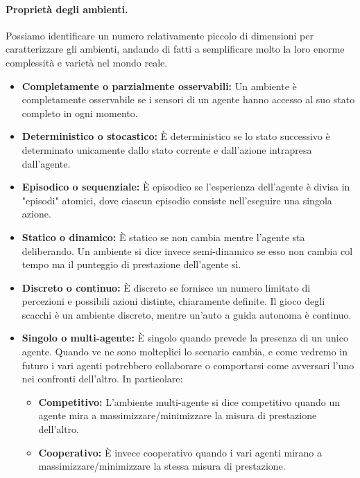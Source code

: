         \paragraph{Proprietà degli ambienti.} Possiamo identificare un numero relativamente piccolo di dimensioni per caratterizzare gli ambienti, andando di fatti a semplificare molto la loro enorme complessità e varietà nel mondo reale.
        \begin{itemize}
            \item \textbf{Completamente o parzialmente osservabili:} Un ambiente è completamente osservabile se i sensori di un agente hanno accesso al suo stato completo in ogni momento.
            \item \textbf{Deterministico o stocastico:} È deterministico se lo stato successivo è determinato unicamente dallo stato corrente e dall'azione intrapresa dall'agente.
            \item \textbf{Episodico o sequenziale:} È episodico se l'esperienza dell'agente è divisa in "episodi" atomici, dove ciascun episodio consiste nell'eseguire una singola azione.
            \item \textbf{Statico o dinamico:} È statico se non cambia mentre l'agente sta deliberando. Un ambiente si dice invece semi-dinamico se esso non cambia col tempo ma il punteggio di prestazione dell'agente sì.
            \item \textbf{Discreto o continuo:} È discreto se fornisce un numero limitato di percezioni e possibili azioni distinte, chiaramente definite. Il gioco degli scacchi è un ambiente discreto, mentre un'auto a guida autonoma è continuo.
            \item \textbf{Singolo o multi-agente:} È singolo quando prevede la presenza di un unico agente. Quando ve ne sono molteplici lo scenario cambia, e come vedremo in futuro i vari agenti potrebbero collaborare o comportarsi come avversari l'uno nei confronti dell'altro. In particolare:
            \begin{itemize}
                \item \textbf{Competitivo:} L'ambiente multi-agente si dice competitivo quando un agente mira a massimizzare/minimizzare la misura di prestazione dell'altro.
                \item \textbf{Cooperativo:} È invece cooperativo quando i vari agenti mirano a massimizzare/minimizzare la stessa misura di prestazione.
            \end{itemize}
        \end{itemize}
        

